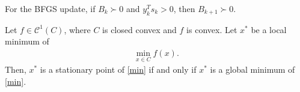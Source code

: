 \documentclass{ExerciseSheet}
\newif\ifsolutions
\begin{document}



\begin{problem}
	For the BFGS update, if $B_k \succ 0$ and $y_k^T s_k > 0$, then $B_{k+1} \succ 0$.


\end{problem}

\ifsolutions
\vskip 0.3cm

\begin{proof}
    Since 
    \begin{equation*}
	B_{k+1} = (I - \rho_k y_k s_k^T) B_k (I - \rho_k s_k y_k^T) + \rho_k y_k y_k^T
	\end{equation*}
	where $\rho_k = \frac{1}{y_k^T s_k} > 0$ using Woodbury formula, for any $z \neq 0$, we have:
	\begin{equation*}
		z^T B_{k+1} z = \tilde{z}^T B_k \tilde{z} + \rho_k (z^T y_k)^2
	\end{equation*}
	where $\tilde{z} = (I - \rho_k s_k y_k^T) z$. We consider two cases:

    
	\noindent \textbf{Case 1:} If $\tilde{z} \neq 0$, then $z^T B_{k+1} z > 0$ since $B_k \succ 0$ and $\rho_k (z^T y_k)^2 \geq 0$.

    
	\noindent \textbf{Case 2:} If $\tilde{z} = 0$, then $(I - \rho_k s_k y_k^T) z = 0$, which implies:
	\begin{equation*}
		z = \rho_k s_k y_k^T z
	\end{equation*}
	In this case:
	\begin{equation*}
		z^T B_{k+1} z = \rho_k (z^T y_k)^2 > 0
	\end{equation*}
	unless $z^T y_k = 0$, which would imply $z = 0$ from $z = \rho_k s_k y_k^T z$.
	Therefore, for any $z \neq 0$, we have $z^T B_{k+1} z > 0$, which means $B_{k+1} \succ 0$.
\end{proof}

\fi
\vskip 0.5cm

\begin{problem}
  Let $f\in \mathcal{C}^1(C)$, where $C$ is closed convex and $f$ is convex. Let $x^*$ be a local minimum of 
  \begin{align}
      \min_{x\in C} f(x) \label{min}.
  \end{align}
  Then, $x^*$ is a stationary point of \eqref{min} if and only if $x^*$ is a global minimum of \eqref{min}.
\end{problem}
\end{document}
